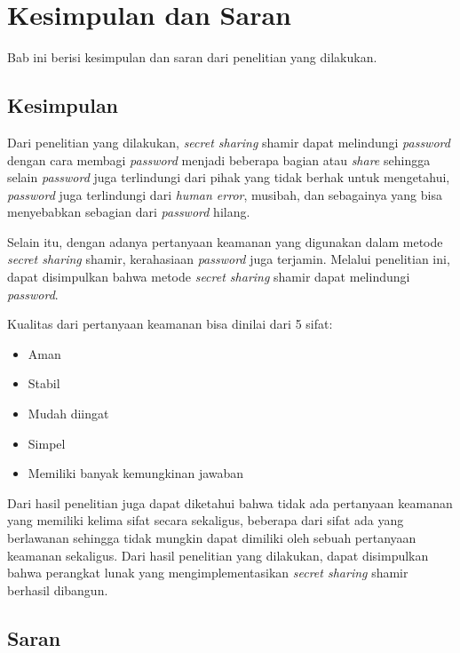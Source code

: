 \chapter{Kesimpulan dan Saran}
\label{chap:Kesimpulan dan Saran}

Bab ini berisi kesimpulan dan saran dari penelitian yang dilakukan.

\section{Kesimpulan}

Dari penelitian yang dilakukan, \textit{secret sharing} shamir dapat melindungi \textit{password} dengan cara membagi \textit{password} menjadi beberapa bagian atau \textit{share} sehingga selain \textit{password} juga terlindungi dari pihak yang tidak berhak untuk mengetahui, \textit{password} juga terlindungi dari \textit{human error}, musibah, dan sebagainya yang bisa menyebabkan sebagian dari \textit{password} hilang.

Selain itu, dengan adanya pertanyaan keamanan yang digunakan dalam metode \textit{secret sharing} shamir, kerahasiaan \textit{password} juga terjamin. Melalui penelitian ini, dapat disimpulkan bahwa metode \textit{secret sharing} shamir dapat melindungi \textit{password}.

Kualitas dari pertanyaan keamanan bisa dinilai dari 5 sifat:
\begin{itemize}
	\item Aman
	\item Stabil
	\item Mudah diingat
	\item Simpel
	\item Memiliki banyak kemungkinan jawaban
\end{itemize}
Dari hasil penelitian juga dapat diketahui bahwa tidak ada pertanyaan keamanan yang memiliki kelima sifat secara sekaligus, beberapa dari sifat ada yang berlawanan sehingga tidak mungkin dapat dimiliki oleh sebuah pertanyaan keamanan sekaligus.
Dari hasil penelitian yang dilakukan, dapat disimpulkan bahwa perangkat lunak yang mengimplementasikan \textit{secret sharing} shamir berhasil dibangun.

\section{Saran}

